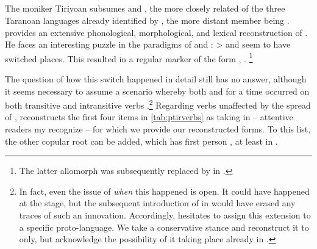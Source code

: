 \subsection{\PTir {}}
\label{sec:taranoan}
The moniker Tiriyoan subsumes \trio and \akuriyo, the more closely related of the three Taranoan languages already identified by \textcite{girard1971proto}, the more distant member being \carijo.
\textcite{meira1998proto} provides an extensive phonological, morphological, and lexical reconstruction of \PTar.
He faces an interesting puzzle in the \setone paradigms of \trio and \akuriyo: \PC {}>  and   seem to have switched places.
This resulted in a regular  marker of the form ,  .%
\footnote{The latter allomorph was subsequently replaced by  in \akuriyo {}.}

The question of how this switch happened in detail \parencite[107--112]{meira1998proto} still has no answer, although it seems necessary to assume a scenario whereby both  and  for a time occurred on both transitive and intransitive verbs \parencite[112]{meira1998proto}.\footnote{
In fact, even the issue of \emph{when} this happened is open.
It could have happened at the \PTar stage, but the subsequent introduction of  in \carijo {} would have erased any traces of such an innovation.
Accordingly, \textcite{meira1998proto} hesitates to assign this extension to a specific proto-language.
We take a conservative stance and reconstruct it to \PTir only, but acknowledge the possibility of it taking place already in \PTar.}
%
Regarding  verbs unaffected by the spread of , \textcite{meira1998proto} reconstructs the first four items in \cref{tab:ptirverbs} as taking  in \PTar -- attentive readers my recognize \trio {} -- for which we provide our reconstructed \PTir forms.
To this list, the other copular root   can be added, which has first person , at least in \trio.

